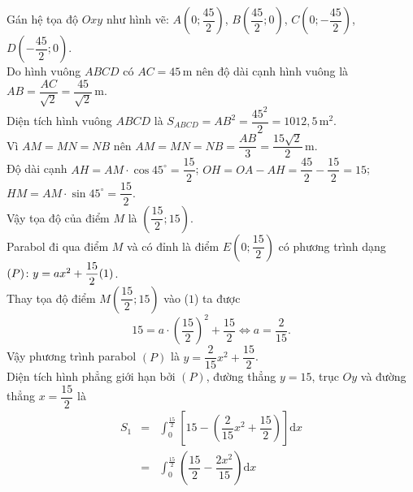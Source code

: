 \begin{bt}
{\begin{center}
		\end{center}
		Gán hệ tọa  độ $Oxy$ như hình vẽ: $A\left(0;\dfrac{45}{2}\right)$, $B\left(\dfrac{45}{2};0\right)$, $C\left(0;-\dfrac{45}{2}\right)$, $D\left(-\dfrac{45}{2};0\right)$.\\
		Do hình vuông $ABCD$ có $AC=45$\,m nên độ dài cạnh hình vuông là $AB  = \dfrac{AC}{\sqrt{2}} = \dfrac{45}{\sqrt{2}}$\,m.\\
		Diện tích hình vuông $ABCD$ là  $S_{ABCD} = AB^2 = \dfrac{45^2}{2} = 1012{,}5$\,m$^2$.\\
		Vì $AM=MN=NB$ nên $AM=MN=NB  = \dfrac{AB}{3} = \dfrac{15\sqrt{2}}{2}$\,m.\\
		Độ dài cạnh 
		$AH = AM \cdot \cos 45^\circ = \dfrac{15}{2}$; 
		$OH = OA - AH  = \dfrac{45}{2} - \dfrac{15}{2} = 15$;
		$HM = AM \cdot \sin 45^\circ = \dfrac{15}{2}$.\\ 
		Vậy tọa độ  của điểm $M$ là $\left(\dfrac{15}{2};15\right)$.\\
		Parabol  đi qua điểm $M$ và có đỉnh là điểm $E\left(0;\dfrac{15}{2}\right)$ có phương trình dạng $(P)\colon y = ax^2 + \dfrac{15}{2} \hfill{(1)}$.\\
		 Thay tọa độ điểm $M\left(\dfrac{15}{2};15\right)$ vào ($1$) ta được
		\[15 = a \cdot \left(\dfrac{15}{2}\right)^2 + \dfrac{15}{2} \Leftrightarrow a = \dfrac{2}{15}. \] 
		Vậy phương trình parabol $(P)$ là $y = \dfrac{2}{15}x^2  + \dfrac{15}{2}$.\\
		Diện tích hình phẳng giới hạn bởi $(P)$, đường thẳng $y=15$, trục $Oy$ và đường thẳng $x=\dfrac{15}{2}$ là 
		\begin{eqnarray*}
			S_1 &= &\displaystyle\int_{0}^{\tfrac{15}{2}}  \left[15 - \left(\dfrac{2}{15}x^2 + \dfrac{15}{2}\right)\right] \mathrm{d}x \\
			&=&\displaystyle\int_{0}^{\tfrac{15}{2}} \left(\dfrac{15}{2} -  \dfrac{2x^2}{15}\right) \mathrm{d}x \\

\end{eqnarray*}}
\end{bt}
